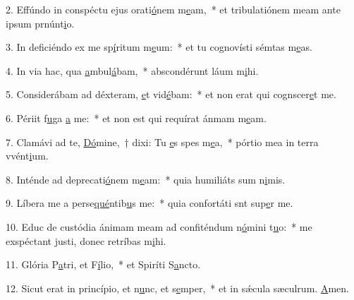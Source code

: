 2. Effúndo in conspéctu ejus orati\uline{ó}nem m\uline{e}am,~* et tribulatiónem meam ante ipsum prnúnt\uline{i}o.\par 
3. In deficiéndo ex me sp\uline{í}ritum m\uline{e}um:~* et tu cognovísti sémtas m\uline{e}as.\par 
4. In via hac, qua \uline{a}mbul\uline{á}bam,~* abscondérunt láum m\uline{i}hi.\par 
5. Considerábam ad déxteram, \uline{e}t vid\uline{é}bam:~* et non erat qui cognscer\uline{e}t me.\par 
6. Périit f\uline{u}ga \uline{a} me:~* et non est qui requírat ánmam m\uline{e}am.\par 
7. Clamávi ad te, \uline{Dó}mine,~† dixi: Tu \uline{e}s spes m\uline{e}a,~* pórtio mea in terra vvént\uline{i}um.\par 
8. Inténde ad deprecati\uline{ó}nem m\uline{e}am:~* quia humiliáts sum n\uline{i}mis.\par 
9. Líbera me a perse\uline{qué}ntib\uline{u}s me:~* quia confortáti snt sup\uline{e}r me.\par 
10. Educ de custódia ánimam meam ad confiténdum n\uline{ó}mini t\uline{u}o:~* me exspéctant justi, donec retríbas m\uline{i}hi.\par 
11. Glória P\uline{a}tri, et F\uline{í}lio,~* et Spiríti S\uline{a}ncto.\par 
12. Sicut erat in princípio, et n\uline{u}nc, et s\uline{e}mper,~* et in sǽcula sæculrum. \uline{A}men.\par 
